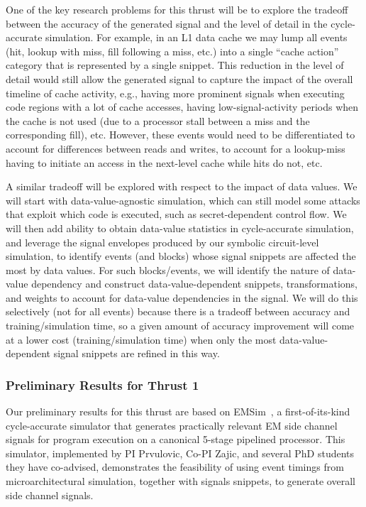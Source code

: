 One of the key research problems for this thrust will be to explore the tradeoff between the accuracy of the generated signal and the level of detail in the cycle-accurate simulation.
For example, in an L1 data cache we may lump all events (hit, lookup with miss, fill following a miss, etc.) into a single ``cache action''  category that is represented by a single snippet. This reduction in the level of detail would still allow the generated signal to capture the impact of the overall timeline of cache activity, e.g., having more prominent signals when executing code regions with a lot of cache accesses, having low-signal-activity periods when the cache is not used (due to a processor stall between a miss and the corresponding fill), etc. However, these events would need to be differentiated to account for differences between reads and writes, to account for a lookup-miss having to initiate an access in the next-level cache while hits do not, etc.

A similar tradeoff will be explored with respect to the impact of data values.
We will start with data-value-agnostic simulation, which can still model some attacks
that exploit which code is executed, such as secret-dependent control flow.
We will then add ability to obtain data-value statistics in cycle-accurate simulation,
and leverage the signal envelopes produced by our symbolic circuit-level simulation, to identify events (and blocks) whose signal snippets are affected the most by data values.
For such blocks/events, we will identify the nature of data-value dependency and construct data-value-dependent snippets, transformations, and weights to account for data-value dependencies in the signal. We will do this selectively (not for all events) because there is a tradeoff between accuracy and training/simulation time, so a given amount of accuracy improvement will come at a lower cost (training/simulation time) when only the most data-value-dependent signal snippets are refined in this way.

\subsubsection{Preliminary Results for Thrust 1}

Our preliminary results for this thrust are based on EMSim~\cite{Nader2020}, a first-of-its-kind cycle-accurate simulator that generates practically relevant EM side channel signals for program execution on a canonical 5-stage pipelined processor. This simulator,
implemented by PI Prvulovic, Co-PI Zajic, and several PhD students they have co-advised, demonstrates the feasibility of using event timings from microarchitectural simulation, together with signals snippets, to generate overall side channel signals.

